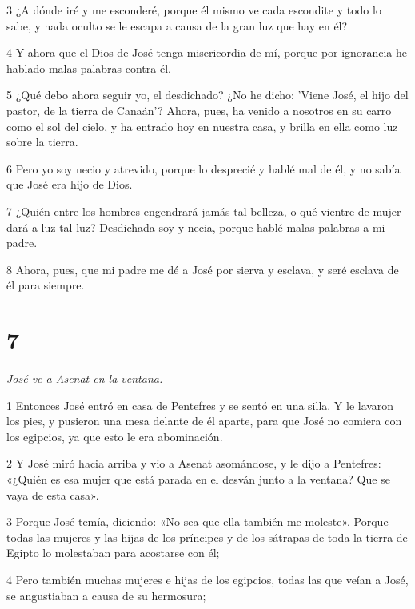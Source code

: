 \par 3 ¿A dónde iré y me esconderé, porque él mismo ve cada escondite y todo lo sabe, y nada oculto se le escapa a causa de la gran luz que hay en él?

\par 4 Y ahora que el Dios de José tenga misericordia de mí, porque por ignorancia he hablado malas palabras contra él.

\par 5 ¿Qué debo ahora seguir yo, el desdichado? ¿No he dicho: 'Viene José, el hijo del pastor, de la tierra de Canaán'? Ahora, pues, ha venido a nosotros en su carro como el sol del cielo, y ha entrado hoy en nuestra casa, y brilla en ella como luz sobre la tierra.

\par 6 Pero yo soy necio y atrevido, porque lo desprecié y hablé mal de él, y no sabía que José era hijo de Dios.

\par 7 ¿Quién entre los hombres engendrará jamás tal belleza, o qué vientre de mujer dará a luz tal luz? Desdichada soy y necia, porque hablé malas palabras a mi padre.

\par 8 Ahora, pues, que mi padre me dé a José por sierva y esclava, y seré esclava de él para siempre.

\chapter{7}

\par \textit{José ve a Asenat en la ventana.}

\par 1 Entonces José entró en casa de Pentefres y se sentó en una silla. Y le lavaron los pies, y pusieron una mesa delante de él aparte, para que José no comiera con los egipcios, ya que esto le era abominación.

\par 2 Y José miró hacia arriba y vio a Asenat asomándose, y le dijo a Pentefres: «¿Quién es esa mujer que está parada en el desván junto a la ventana? Que se vaya de esta casa».

\par 3 Porque José temía, diciendo: «No sea que ella también me moleste». Porque todas las mujeres y las hijas de los príncipes y de los sátrapas de toda la tierra de Egipto lo molestaban para acostarse con él;

\par 4 Pero también muchas mujeres e hijas de los egipcios, todas las que veían a José, se angustiaban a causa de su hermosura;

